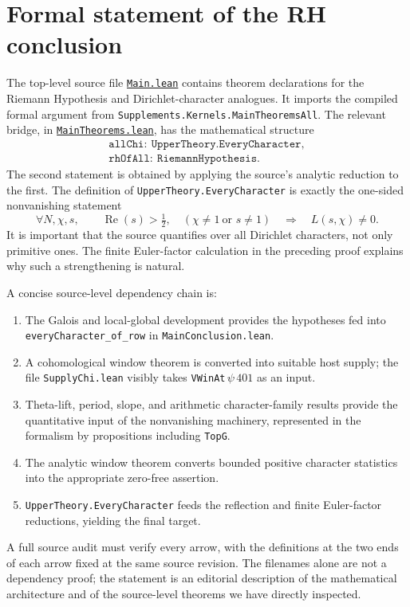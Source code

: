 \documentclass[11pt,openany,oneside]{scrbook}
\theoremstyle{definition}
\theoremstyle{remark}
\newcommand{\Rea}{\operatorname{Re}}
\newcommand{\baseurl}{https://github.com/CocoSgt/riemann-hypothesis-lean/blob/7cbf7a0c32fca1badf05931879a37c3f8a2b03b4/}
\newcommand{\sourcefile}[2]{\href{\baseurl#1}{\texttt{#2}}}
\begin{document}
\section{Formal statement of the RH conclusion}

The top-level source file \sourcefile{src/Main.lean}{Main.lean} contains theorem declarations for the Riemann Hypothesis and Dirichlet-character analogues. It imports the compiled formal argument from \texttt{Supplements.Kernels.MainTheoremsAll}. The relevant bridge, in
\sourcefile{src/Supplements/Kernels/MainTheorems.lean}{MainTheorems.lean}, has the mathematical structure
\[
\begin{gathered}
\texttt{allChi}:\ \texttt{UpperTheory.EveryCharacter},\\
\texttt{rhOfAll}:\ \texttt{RiemannHypothesis}.
\end{gathered}
\]
The second statement is obtained by applying the source's analytic reduction to the first. The definition of \texttt{UpperTheory.EveryCharacter} is exactly the one-sided nonvanishing statement
\[
\forall N,\chi,s,\qquad
\Rea(s)>\tfrac12,
\quad(\chi\ne1\ \text{or }s\ne1)
\quad\Longrightarrow\quad L(s,\chi)\ne0.
\]
It is important that the source quantifies over all Dirichlet characters, not only primitive ones. The finite Euler-factor calculation in the preceding proof explains why such a strengthening is natural.

A concise source-level dependency chain is:
\begin{enumerate}
\item The Galois and local-global development provides the hypotheses fed into \texttt{everyCharacter\_of\_row} in \texttt{MainConclusion.lean}.
\item A cohomological window theorem is converted into suitable host supply; the file \texttt{SupplyChi.lean} visibly takes \texttt{VWinAt}\,$\psi$\,$401$ as an input.
\item Theta-lift, period, slope, and arithmetic character-family results provide the quantitative input of the nonvanishing machinery, represented in the formalism by propositions including \texttt{TopG}.
\item The analytic window theorem converts bounded positive character statistics into the appropriate zero-free assertion.
\item \texttt{UpperTheory.EveryCharacter} feeds the reflection and finite Euler-factor reductions, yielding the final target.
\end{enumerate}
A full source audit must verify every arrow, with the definitions at the two ends of each arrow fixed at the same source revision. The filenames alone are not a dependency proof; the statement is an editorial description of the mathematical architecture and of the source-level theorems we have directly inspected.
\end{document}
